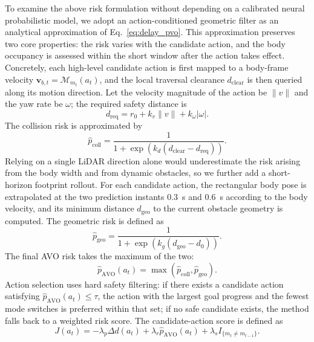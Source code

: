 \documentclass[10pt,a4paper,twocolumn]{article}
\begin{document}
To examine the above risk formulation without depending on a calibrated neural probabilistic model, we adopt an action-conditioned geometric filter as an analytical approximation of Eq.~\ref{eq:delay_pvo}. This approximation preserves two core properties: the risk varies with the candidate action, and the body occupancy is assessed within the short window after the action takes effect. Concretely, each high-level candidate action is first mapped to a body-frame velocity $\mathbf v_{b,t}=\mathcal M_{m_t}(a_t)$, and the local traversal clearance $d_{\mathrm{clear}}$ is then queried along its motion direction. Let the velocity magnitude of the action be $\|v\|$ and the yaw rate be $\omega$; the required safety distance is
\begin{equation}
    d_{\mathrm{req}} = r_0 + k_v\|v\| + k_\omega|\omega|.
\end{equation}
The collision risk is approximated by
\begin{equation}
    \hat{p}_{\mathrm{coll}}=
    \frac{1}{1+\exp\left(k_d(d_{\mathrm{clear}}-d_{\mathrm{req}})\right)}.
    \label{eq:pvo_filter}
\end{equation}
Relying on a single LiDAR direction alone would underestimate the risk arising from the body width and from dynamic obstacles, so we further add a short-horizon footprint rollout. For each candidate action, the rectangular body pose is extrapolated at the two prediction instants $0.3$~s and $0.6$~s according to the body velocity, and its minimum distance $d_{\mathrm{geo}}$ to the current obstacle geometry is computed. The geometric risk is defined as
\begin{equation}
    \hat{p}_{\mathrm{geo}} =
    \frac{1}{1+\exp\left(k_g(d_{\mathrm{geo}}-d_0)\right)}.
\end{equation}
The final AVO risk takes the maximum of the two:
\begin{equation}
    \hat{p}_{\mathrm{AVO}}(a_t)=
    \max(\hat{p}_{\mathrm{coll}},\hat{p}_{\mathrm{geo}}).
\end{equation}
Action selection uses hard safety filtering: if there exists a candidate action satisfying $\hat{p}_{\mathrm{AVO}}(a_t)\le \tau$, the action with the largest goal progress and the fewest mode switches is preferred within that set; if no safe candidate exists, the method falls back to a weighted risk score. The candidate-action score is defined as
\begin{equation}
    J(a_t)=-\lambda_p \Delta d(a_t)+\lambda_r \hat{p}_{\mathrm{AVO}}(a_t)
    +\lambda_s I_{\{m_t\ne m_{t-1}\}}.
\end{equation}
\end{document}

